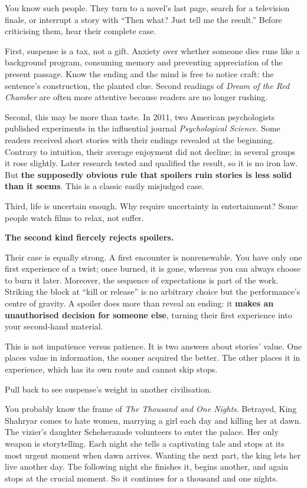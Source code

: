 You know such people. They turn to a novel's last page, search for a television finale, or interrupt a story with ``Then what? Just tell me the result.'' Before criticising them, hear their complete case.

First, suspense is a tax, not a gift. Anxiety over whether someone dies runs like a background program, consuming memory and preventing appreciation of the present passage. Know the ending and the mind is free to notice craft: the sentence's construction, the planted clue. Second readings of \emph{Dream of the Red Chamber} are often more attentive because readers are no longer rushing.

Second, this may be more than taste. In 2011, two American psychologists published experiments in the influential journal \emph{Psychological Science}. Some readers received short stories with their endings revealed at the beginning. Contrary to intuition, their average enjoyment did not decline; in several groups it rose slightly. Later research tested and qualified the result, so it is no iron law. But \textbf{the supposedly obvious rule that spoilers ruin stories is less solid than it seems}. This is a classic easily misjudged case.

Third, life is uncertain enough. Why require uncertainty in entertainment? Some people watch films to relax, not suffer.

\textbf{The second kind fiercely rejects spoilers.}

Their case is equally strong. A first encounter is nonrenewable. You have only one first experience of a twist; once burned, it is gone, whereas you can always choose to burn it later. Moreover, the sequence of expectations is part of the work. Striking the block at ``kill or release'' is no arbitrary choice but the performance's centre of gravity. A spoiler does more than reveal an ending: it \textbf{makes an unauthorised decision for someone else}, turning their first experience into your second-hand material.

This is not impatience versus patience. It is two answers about stories' value. One places value in information, the sooner acquired the better. The other places it in experience, which has its own route and cannot skip stops.

Pull back to see suspense's weight in another civilisation.

You probably know the frame of \emph{The Thousand and One Nights}. Betrayed, King Shahryar comes to hate women, marrying a girl each day and killing her at dawn. The vizier's daughter Scheherazade volunteers to enter the palace. Her only weapon is storytelling. Each night she tells a captivating tale and stops at its most urgent moment when dawn arrives. Wanting the next part, the king lets her live another day. The following night she finishes it, begins another, and again stops at the crucial moment. So it continues for a thousand and one nights.

